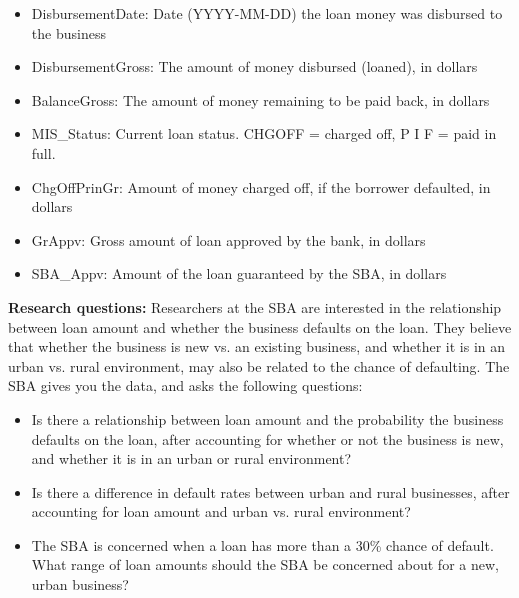 \documentclass[11pt]{article}
\begin{document}
\begin{itemize}
\item DisbursementDate: 	Date (YYYY-MM-DD) the loan money was disbursed to the business
\item DisbursementGross:	The amount of money disbursed (loaned), in dollars
\item BalanceGross: 	The amount of money remaining to be paid back, in dollars
\item MIS\_Status: 	Current loan status. CHGOFF = charged off, P I F = paid in full.
\item ChgOffPrinGr: 	Amount of money charged off, if the borrower defaulted, in dollars
\item GrAppv: 	Gross amount of loan approved by the bank, in dollars
\item SBA\_Appv: 	Amount of the loan guaranteed by the SBA, in dollars 
\end{itemize}

\noindent \textbf{Research questions:} Researchers at the SBA are interested in the relationship between loan amount and whether the business defaults on the loan. They believe that whether the business is new vs. an existing business, and whether it is in an urban vs. rural environment, may also be related to the chance of defaulting. The SBA gives you the data, and asks the following questions:
\begin{itemize}
\item Is there a relationship between loan amount and the probability the business defaults on the loan, after accounting for whether or not the business is new, and whether it is in an urban or rural environment?
\item Is there a difference in default rates between urban and rural businesses, after accounting for loan amount and urban vs. rural environment?
\item The SBA is concerned when a loan has more than a 30\% chance of default. What range of loan amounts should the SBA be concerned about for a new, urban business?
\end{itemize}
\end{document}
